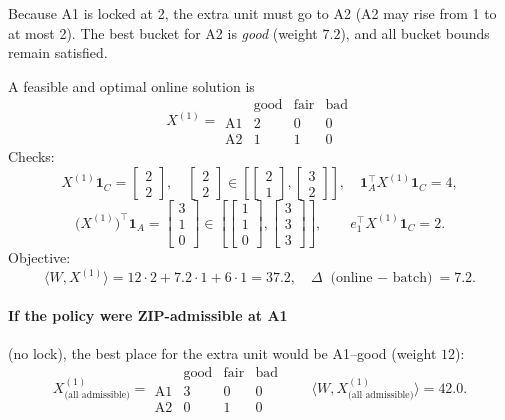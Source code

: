 \documentclass[11pt]{article}
\begin{document}
Because A1 is locked at 2, the extra unit must go to A2 (A2 may rise from 1 to at most 2).  
The best bucket for A2 is \emph{good} (weight $7.2$), and all bucket bounds remain satisfied.

A feasible and optimal online solution is
\[
X^{(1)}=
\begin{array}{c|ccc}
 & \text{good} & \text{fair} & \text{bad} \\\hline
\text{A1} & 2 & 0 & 0 \\
\text{A2} & 1 & 1 & 0
\end{array}
\]
Checks:
\[
X^{(1)}\mathbf{1}_C=\begin{bmatrix}2\\[2pt]2\end{bmatrix},
\quad
\begin{bmatrix}2\\[2pt]2\end{bmatrix}\in
\left[\begin{bmatrix}2\\[2pt]1\end{bmatrix},\begin{bmatrix}3\\[2pt]2\end{bmatrix}\right],
\quad
\mathbf{1}_A^\top X^{(1)}\mathbf{1}_C=4,
\]
\[
\big(X^{(1)}\big)^\top\mathbf{1}_A=\begin{bmatrix}3\\[2pt]1\\[2pt]0\end{bmatrix}
\in
\left[\begin{bmatrix}1\\[2pt]1\\[2pt]0\end{bmatrix},\begin{bmatrix}3\\[2pt]3\\[2pt]3\end{bmatrix}\right],
\qquad
e_1^\top X^{(1)}\mathbf{1}_C=2.
\]
Objective:
\[
\langle W,X^{(1)}\rangle
= 12\cdot 2 + 7.2\cdot 1 + 6\cdot 1
= 37.2,
\quad
\Delta \text{ (online $-$ batch)} = 7.2.
\]

\paragraph*{If the policy were ZIP-admissible at A1} (no lock), the best place for the extra unit would be A1--good (weight $12$):
\[
X^{(1)}_{\text{(all admissible)}}=
\begin{array}{c|ccc}
 & \text{good} & \text{fair} & \text{bad} \\\hline
\text{A1} & 3 & 0 & 0 \\
\text{A2} & 0 & 1 & 0
\end{array}
\qquad
\langle W,X^{(1)}_{\text{(all admissible)}}\rangle = 42.0.
\]
\end{document}
